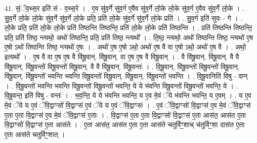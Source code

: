 \documentclass[17pt]{extarticle}
\begin{document}
41. सं॒ॅव॒थ्स॒र इति॑ सं - व॒थ्स॒रे । . ए॒व सु॑व॒र्गे सु॑व॒र्ग ए॒वैव सु॑व॒र्गे लो॒के लो॒के सु॑व॒र्ग ए॒वैव सु॑व॒र्गे लो॒के । . सु॒व॒र्गे लो॒के लो॒के सु॑व॒र्गे सु॑व॒र्गे लो॒के प्रति॒ प्रति॑ लो॒के सु॑व॒र्गे सु॑व॒र्गे लो॒के प्रति॑ । . सु॒व॒र्ग इति॑ सुवः - गे । . लो॒के प्रति॒ प्रति॑ लो॒के लो॒के प्रति॑ तिष्ठन्ति तिष्ठन्ति॒ प्रति॑ लो॒के लो॒के प्रति॑ तिष्ठन्ति । . प्रति॑ तिष्ठन्ति तिष्ठन्ति॒ प्रति॒ प्रति॑ तिष्ठ॒ न्त्यथो॒ अथो॑ तिष्ठन्ति॒ प्रति॒ प्रति॑ तिष्ठ॒ न्त्यथो᳚ । . ति॒ष्ठ॒ न्त्यथो॒ अथो॑ तिष्ठन्ति तिष्ठ॒ न्त्यथो॑ ए॒ष ए॒षो ऽथो॑ तिष्ठन्ति तिष्ठ॒ न्त्यथो॑ ए॒षः । . अथो॑ ए॒ष ए॒षो ऽथो॒ अथो॑ ए॒ष वै वा ए॒षो ऽथो॒ अथो॑ ए॒ष वै । . अथो॒ इत्यथो᳚ । . ए॒ष वै वा ए॒ष ए॒ष वै वि॑षू॒वान्. वि॑षू॒वान्. वा ए॒ष ए॒ष वै वि॑षू॒वान् । . वै वि॑षू॒वान्. वि॑षू॒वान्. वै वै वि॑षू॒वान्. वि॑षू॒वन्तो॑ विषू॒वन्तो॑ विषू॒वान्. वै वै वि॑षू॒वान्. वि॑षू॒वन्तः॑ । . वि॒षू॒वान्. वि॑षू॒वन्तो॑ विषू॒वन्तो॑ विषू॒वान्. वि॑षू॒वान्. वि॑षू॒वन्तो॑ भवन्ति भवन्ति विषू॒वन्तो॑ विषू॒वान्. वि॑षू॒वान्. वि॑षू॒वन्तो॑ भवन्ति । . वि॒षू॒वानिति॑ विषु - वान् । . वि॒षू॒वन्तो॑ भवन्ति भवन्ति विषू॒वन्तो॑ विषू॒वन्तो॑ भवन्ति॒ ये ये भ॑वन्ति विषू॒वन्तो॑ विषू॒वन्तो॑ भवन्ति॒ ये । . वि॒षू॒वन्त॒ इति॑ विषु - वन्तः॑ । . भ॒व॒न्ति॒ ये ये भ॑वन्ति भवन्ति॒ य ए॒व मे॒वं ॅये भ॑वन्ति भवन्ति॒ य ए॒वम् । . य ए॒व मे॒वं ॅये य ए॒वं ॅवि॒द्वाꣳसो॑ वि॒द्वाꣳस॑ ए॒वं ॅये य ए॒वं ॅवि॒द्वाꣳसः॑ । . ए॒वं ॅवि॒द्वाꣳसो॑ वि॒द्वाꣳस॑ ए॒व मे॒वं ॅवि॒द्वाꣳस॑ ए॒ता ए॒ता वि॒द्वाꣳस॑ ए॒व मे॒वं ॅवि॒द्वाꣳस॑ ए॒ताः । . वि॒द्वाꣳस॑ ए॒ता ए॒ता वि॒द्वाꣳसो॑ वि॒द्वाꣳस॑ ए॒ता आस॑त॒ आस॑त ए॒ता वि॒द्वाꣳसो॑ वि॒द्वाꣳस॑ ए॒ता आस॑ते । . ए॒ता आस॑त॒ आस॑त ए॒ता ए॒ता आस॑ते चतुर्विꣳ॒॒शाच् च॑तुर्विꣳ॒॒शा दास॑त ए॒ता ए॒ता आस॑ते चतुर्विꣳ॒॒शात् । \newline
\end{document}
